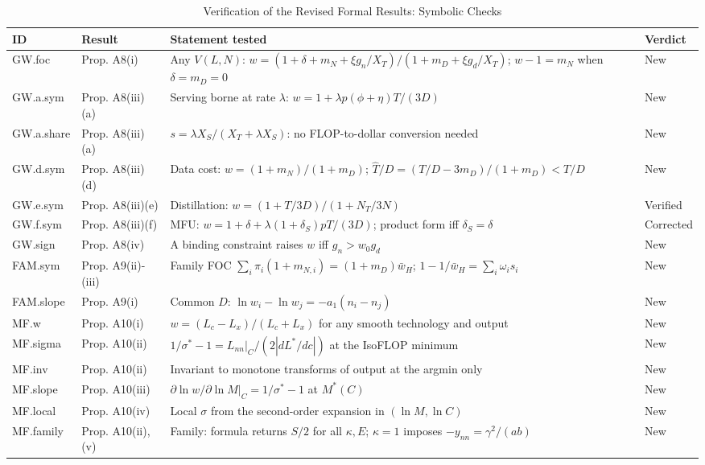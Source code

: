 \begin{table}[tp]
\centering
\caption{Verification of the Revised Formal Results: Symbolic Checks}
\label{tab:ra5-claims}
\scriptsize
\setlength{\tabcolsep}{4pt}
\begin{tabular}{@{}l >{\raggedright\arraybackslash}p{} >{\raggedright\arraybackslash}p{} l@{}}
\toprule
ID & Result & Statement tested & Verdict \\
\midrule
GW.foc & Prop. A8(i) & Any $V(L,N)$: $w=(1+\delta+m_N+\xi g_n/X_T)/(1+m_D+\xi g_d/X_T)$; $w-1=m_N$ when $\delta=m_D=0$ & New \\
GW.a.sym & Prop. A8(iii)(a) & Serving borne at rate $\lambda$: $w=1+\lambda p(\phi+\eta)T/(3D)$ & New \\
GW.a.share & Prop. A8(iii)(a) & $s=\lambda X_S/(X_T+\lambda X_S)$: no FLOP-to-dollar conversion needed & New \\
GW.d.sym & Prop. A8(iii)(d) & Data cost: $w=(1+m_N)/(1+m_D)$; $\hat T/D=(T/D-3m_D)/(1+m_D)<T/D$ & New \\
GW.e.sym & Prop. A8(iii)(e) & Distillation: $w=(1+T/3D)/(1+N_T/3N)$ & Verified \\
GW.f.sym & Prop. A8(iii)(f) & MFU: $w=1+\delta+\lambda(1+\delta_S)pT/(3D)$; product form iff $\delta_S=\delta$ & Corrected \\
GW.sign & Prop. A8(iv) & A binding constraint raises $w$ iff $g_n>w_0g_d$ & New \\
FAM.sym & Prop. A9(ii)-(iii) & Family FOC $\sum_i\pi_i(1+m_{N,i})=(1+m_D)\bar w_H$; $1-1/\bar w_H=\sum_i\omega_is_i$ & New \\
FAM.slope & Prop. A9(i) & Common $D$: $\ln w_i-\ln w_j=-a_1(n_i-n_j)$ & New \\
MF.w & Prop. A10(i) & $w=(L_c-L_x)/(L_c+L_x)$ for any smooth technology and output & New \\
MF.sigma & Prop. A10(ii) & $1/\sigma^*-1=L_{nn}|_C/(2|dL^*/dc|)$ at the IsoFLOP minimum & New \\
MF.inv & Prop. A10(ii) & Invariant to monotone transforms of output at the argmin only & New \\
MF.slope & Prop. A10(iii) & $\partial\ln w/\partial\ln M|_C=1/\sigma^*-1$ at $M^*(C)$ & New \\
MF.local & Prop. A10(iv) & Local $\sigma$ from the second-order expansion in $(\ln M,\ln C)$ & New \\
MF.family & Prop. A10(ii),(v) & Family: formula returns $S/2$ for all $\kappa,E$; $\kappa=1$ imposes $-y_{nn}=\gamma^2/(ab)$ & New \\

\end{tabular}
\end{table}
